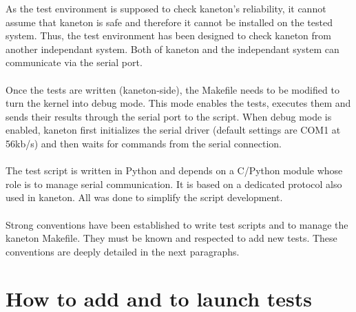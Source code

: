 {\indent As the test environment is supposed to check kaneton's reliability, it
cannot assume that kaneton is safe and therefore it cannot be installed on the
tested system. Thus, the test environment has been designed to check kaneton
from another independant system. Both of kaneton and the independant system can
communicate via the serial port.\\
\\
\indent Once the tests are written (kaneton-side), the Makefile needs to be
modified to turn the kernel into debug mode. This mode enables the tests,
executes them and sends their results through the serial port to the script.
When debug mode is enabled, kaneton first initializes the serial driver (default
settings are COM1 at 56kb/s) and then waits for commands from the serial
connection.\\
\\
The test script is written in Python and depends on a C/Python module whose
role is to manage serial communication. It is based on a dedicated protocol
also used in kaneton. All was done to simplify the script development.\\
\\
\indent Strong conventions have been established to write test scripts and to
manage the kaneton Makefile. They must be known and respected to add new tests.
These conventions are deeply detailed in the next paragraphs.


\section{How to add and to launch tests}

}
